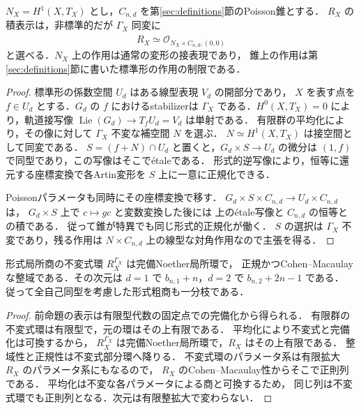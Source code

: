 \begin{proposition}[同変な形式積表示]
\label{prop:equivariant-formal-product}
$N_X=H^1(X,T_X)$ とし，$C_{n,d}$ を第\ref{sec:definitions}節のPoisson錐とする．
$R_X$ の積表示は，非標準的だが $\Gamma_X$ 同変に
\[
 R_X\simeq
 \widehat{\mathcal O}_{N_X\times C_{n,d},(0,0)}
\]
と選べる．$N_X$ 上の作用は通常の変形の接表現であり，
錐上の作用は第\ref{sec:definitions}節に書いた標準形の作用の制限である．
\end{proposition}
\begin{proof}
標準形の係数空間 $U_d$ はある線型表現 $V_d$ の開部分であり，
$X$ を表す点を $f\in U_d$ とする．$G_d$ の $f$ におけるstabilizerは
$\Gamma_X$ である．$H^0(X,T_X)=0$ により，軌道接写像
$\operatorname{Lie}(G_d)\to T_fU_d=V_d$ は単射である．
有限群の平均化により，その像に対して $\Gamma_X$ 不変な補空間 $N$ を選ぶ．
$N\simeq H^1(X,T_X)$ は接空間として同変である．
$S=(f+N)\cap U_d$ と置くと，$G_d\times S\to U_d$ の微分は
$(1,f)$ で同型であり，この写像はそこで\'{e}taleである．
形式的逆写像により，恒等に還元する座標変換で各Artin変形を
$S$ 上に一意に正規化できる．

Poissonパラメータも同時にその座標変換で移す．
$G_d\times S\times C_{n,d}\to U_d\times C_{n,d}$ は，
$G_d\times S$ 上で $c\mapsto gc$ と変数変換した後には
上の\'{e}tale写像と $C_{n,d}$ の恒等との積である．
従って錐が特異でも同じ形式的正規化が働く．
$S$ の選択は $\Gamma_X$ 不変であり，残る作用は
$N\times C_{n,d}$ 上の線型な対角作用なので主張を得る．
\end{proof}

\begin{corollary}[形式粗商の正規性と一分枝性]
\label{cor:formal-coarse-normal}
形式局所商の不変式環 $R_X^{\Gamma_X}$ は完備Noether局所環で，
正規かつCohen--Macaulayな整域である．その次元は
$d=1$ で $b_{n,1}+n$，$d=2$ で $b_{n,2}+2n-1$ である．
従って全自己同型を考慮した形式粗商も一分枝である．
\end{corollary}
\begin{proof}
前命題の表示は有限型代数の固定点での完備化から得られる．
有限群の不変式環は有限型で，元の環はその上有限である．
平均化により不変式と完備化は可換するから，
$R_X^{\Gamma_X}$ は完備Noether局所環で，$R_X$ はその上有限である．
整域性と正規性は不変式部分環へ降りる．
不変式環のパラメータ系は有限拡大 $R_X$ のパラメータ系にもなるので，
$R_X$ のCohen--Macaulay性からそこで正則列である．
平均化は不変な各パラメータによる商と可換するため，
同じ列は不変式環でも正則列となる．次元は有限整拡大で変わらない．
\end{proof}

